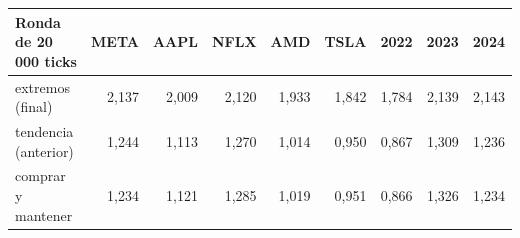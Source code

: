 \begin{tabular}{lrrrrrrrr}
\toprule
Ronda de 20\,000 ticks & META & AAPL & NFLX & AMD & TSLA & 2022 & 2023 & 2024 \\
\midrule
extremos (final) & 2,137 & 2,009 & 2,120 & 1,933 & 1,842 & 1,784 & 2,139 & 2,143 \\
tendencia (anterior) & 1,244 & 1,113 & 1,270 & 1,014 & 0,950 & 0,867 & 1,309 & 1,236 \\
comprar y mantener & 1,234 & 1,121 & 1,285 & 1,019 & 0,951 & 0,866 & 1,326 & 1,234 \\
\bottomrule
\end{tabular}
